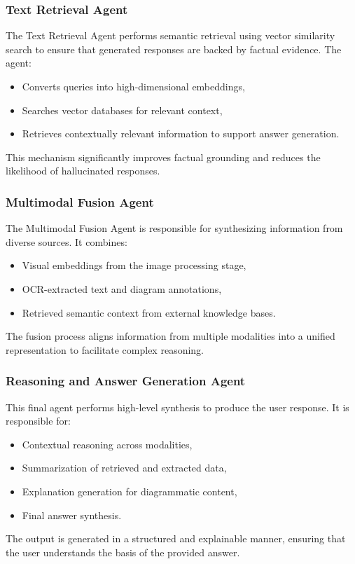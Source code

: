 \documentclass[conference]{IEEEtran}
\begin{document}
\subsubsection{Text Retrieval Agent}
The Text Retrieval Agent performs semantic retrieval using vector similarity search to ensure that generated responses are backed by factual evidence. The agent:
\begin{itemize}
    \item Converts queries into high-dimensional embeddings,
    \item Searches vector databases for relevant context,
    \item Retrieves contextually relevant information to support answer generation.
\end{itemize}
This mechanism significantly improves factual grounding and reduces the likelihood of hallucinated responses.


\subsubsection{Multimodal Fusion Agent}
The Multimodal Fusion Agent is responsible for synthesizing information from diverse sources. It combines:
\begin{itemize}
    \item Visual embeddings from the image processing stage,
    \item OCR-extracted text and diagram annotations,
    \item Retrieved semantic context from external knowledge bases.
\end{itemize}
The fusion process aligns information from multiple modalities into a unified representation to facilitate complex reasoning.

\subsubsection{Reasoning and Answer Generation Agent}
This final agent performs high-level synthesis to produce the user response. It is responsible for:
\begin{itemize}
    \item Contextual reasoning across modalities,
    \item Summarization of retrieved and extracted data,
    \item Explanation generation for diagrammatic content,
    \item Final answer synthesis.
\end{itemize}
The output is generated in a structured and explainable manner, ensuring that the user understands the basis of the provided answer.
\end{document}
